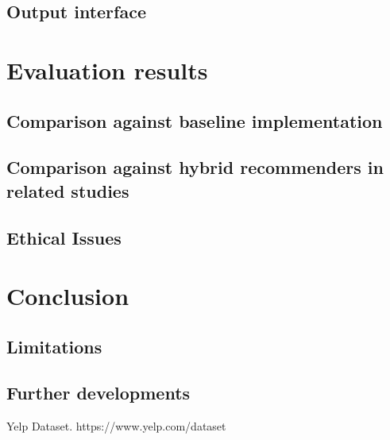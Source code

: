 \documentclass[conference]{IEEEtran}
\begin{document}
\subsection{Output interface}

\section{Evaluation results}

\subsection{Comparison against baseline implementation}

\subsection{Comparison against hybrid recommenders in related studies}

\subsection{Ethical Issues}

\section{Conclusion}

\subsection{Limitations}

\subsection{Further developments}


\begin{thebibliography}{00}
     Yelp Dataset. https://www.yelp.com/dataset
\end{thebibliography}
\end{document}
